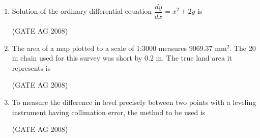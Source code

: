 \documentclass[journal,12pt,onecolumn]{IEEEtran}
\begin{document}
\begin{enumerate}
\medskip

\item 
 Solution of the ordinary differential equation $\dfrac{dy}{dx} = x^2 + 2y$ is
\begin{enumerate}
\end{enumerate}
\hfill(GATE AG 2008)\\

\medskip

\item 
 The area of a map plotted to a scale of 1:3000 measures $9069.37$ mm$^2$. The 20 m chain used for this survey was short by 0.2 m. The true land area it represents is \\
\begin{enumerate}
\end{enumerate}
\hfill(GATE AG 2008)\\

\medskip

\item 
 To measure the difference in level precisely between two points with a leveling instrument having collimation error, the method to be used is 
\begin{enumerate}
\end{enumerate}
\hfill(GATE AG 2008)\\

\medskip


\end{enumerate}
\end{document}
